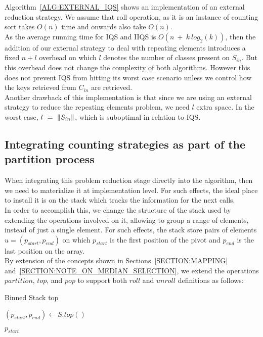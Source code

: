 Algorithm~\ref{ALG:EXTERNAL_IQS} shows an implementation of an external reduction strategy. We assume that roll operation, as it is an instance of counting sort takes $O(n)$ time and onwards also take $O(n)$. \\

As the average running time for IQS and IIQS is $O(n~+~k~log_2(k))$, then the addition of our external strategy to deal with repeating elements introduces a fixed $n + l$ overhead on which $l$ denotes the number of classes present on $S_{in}$. But this overhead does not change the complexity of both algorithms. However this does not prevent IQS from hitting its worst case scenario unless we control how the keys retrieved from $C_{in}$ are retrieved.\\

Another drawback of this implementation is that since we are using an external strategy to reduce the repeating elements problem, we need $l$ extra space. In the worst case, $l~=~\lVert S_{in}\rVert$, which is suboptimal in relation to IQS.\\

\subsection{Integrating counting strategies as part of the partition process}

When integrating this problem reduction stage directly into the algorithm, then we need to materialize it at implementation level. For such effects, the ideal place to install it is on the stack which tracks the information for the next calls. \\

In order to accomplish this, we change the structure of the stack used by extending the operations involved on it, allowing to group a range of elements, instead of just a single element. For such effects, the stack store pairs of elements $u = (p_{start}, p_{end})$ on which $p_{start}$ is the first position of the pivot and $p_{end}$ is the last position on the array. \\

By extension of the concepts shown in Sections~\ref{SECTION:MAPPING} and~\ref{SECTION:NOTE_ON_MEDIAN_SELECTION}, we extend the operations $partition$, $top$, and $pop$ to support both $roll$ and $unroll$ definitions as follows:



\begin{algorithm}
    \caption{Binned Stack top}\label{ALG:STACK_TOP}
    \begin{algorithmic}[1]
        \State $(p_{start}, p_{end}) \gets S.top()$
        
        \State \Return $p_{start}$
        \EndProcedure
\end{algorithmic}
\end{algorithm}


